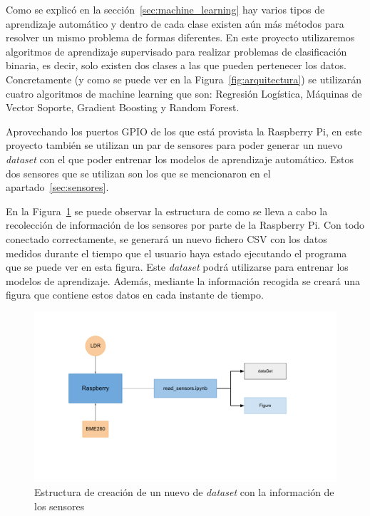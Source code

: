 \documentclass[a4paper, 12pt]{book}
\begin{document}
Como se explicó en la sección~\ref{sec:machine_learning} hay varios tipos de aprendizaje automático y dentro de cada clase existen aún más métodos para resolver un mismo problema de formas diferentes. En este proyecto utilizaremos algoritmos de aprendizaje supervisado para realizar problemas de clasificación binaria, es decir, solo existen dos clases a las que pueden pertenecer los datos. Concretamente (y como se puede ver en la Figura~\ref{fig:arquitectura}) se utilizarán cuatro algoritmos de machine learning que son: Regresión Logística, Máquinas de Vector Soporte, Gradient Boosting y Random Forest.

Aprovechando los puertos GPIO de los que está provista la Raspberry Pi, en este proyecto también se utilizan un par de sensores para poder generar un nuevo \textit{dataset} con el que poder entrenar los modelos de aprendizaje automático. Estos dos sensores que se utilizan son los que se mencionaron en el apartado~\ref{sec:sensores}.

En la Figura~\ref{fig:esquema_sensores} se puede observar la estructura de como se lleva a cabo la recolección de información de los sensores por parte de la Raspberry Pi. Con todo conectado correctamente, se generará un nuevo fichero CSV con los datos medidos durante el tiempo que el usuario haya estado ejecutando el programa que se puede ver en esta figura. Este \textit{dataset} podrá utilizarse para entrenar los modelos de aprendizaje. Además, mediante la información recogida se creará una figura que contiene estos datos en cada instante de tiempo.

\begin{figure}[htb]
  \centering
  \includegraphics[width=15cm, keepaspectratio]{img/esquema_sensores.pdf}
  \caption{Estructura de creación de un nuevo de \textit{dataset} con la información de los sensores}\label{fig:esquema_sensores}
\end{figure}
\end{document}
